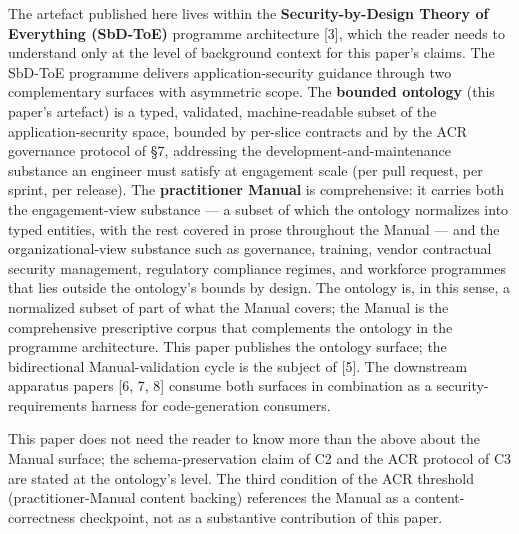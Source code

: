 \documentclass[
]{article}
\begin{document}
The artefact published here lives within the \textbf{Security-by-Design
Theory of Everything (SbD-ToE)} programme architecture {[}3{]}, which
the reader needs to understand only at the level of background context
for this paper's claims. The SbD-ToE programme delivers
application-security guidance through two complementary surfaces with
asymmetric scope. The \textbf{bounded ontology} (this paper's artefact)
is a typed, validated, machine-readable subset of the
application-security space, bounded by per-slice contracts and by the
ACR governance protocol of §7, addressing the
development-and-maintenance substance an engineer must satisfy at
engagement scale (per pull request, per sprint, per release). The
\textbf{practitioner Manual} is comprehensive: it carries both the
engagement-view substance --- a subset of which the ontology normalizes
into typed entities, with the rest covered in prose throughout the
Manual --- and the organizational-view substance such as governance,
training, vendor contractual security management, regulatory compliance
regimes, and workforce programmes that lies outside the ontology's
bounds by design. The ontology is, in this sense, a normalized subset of
part of what the Manual covers; the Manual is the comprehensive
prescriptive corpus that complements the ontology in the programme
architecture. This paper publishes the ontology surface; the
bidirectional Manual-validation cycle is the subject of {[}5{]}. The
downstream apparatus papers {[}6, 7, 8{]} consume both surfaces in
combination as a security-requirements harness for code-generation
consumers.

This paper does not need the reader to know more than the above about
the Manual surface; the schema-preservation claim of C2 and the ACR
protocol of C3 are stated at the ontology's level. The third condition
of the ACR threshold (practitioner-Manual content backing) references
the Manual as a content-correctness checkpoint, not as a substantive
contribution of this paper.
\end{document}
